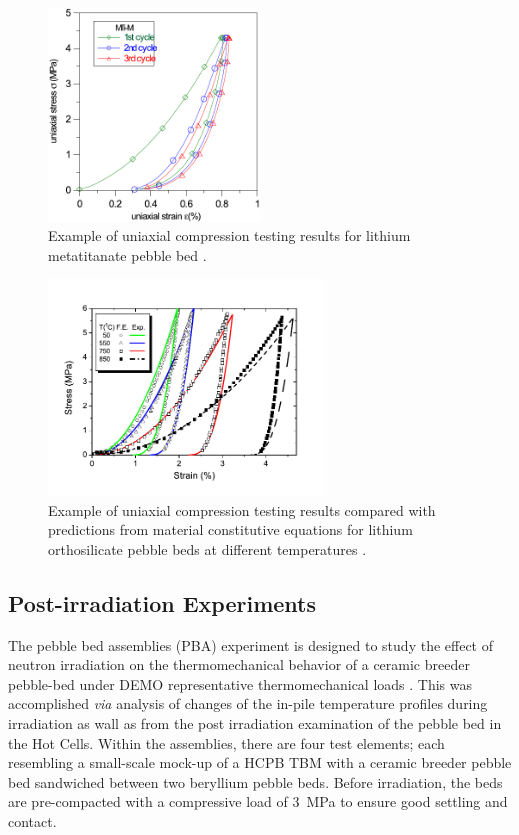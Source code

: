 \documentclass[11pt]{report} %
\begin{document}
\begin{figure}[h]
    \centering
    \includegraphics[width=0.5\textwidth]{images/Fig-1}
    \caption{Example of uniaxial compression testing results for lithium metatitanate pebble bed \cite{vanderlaan2011}.}
    \label{fig:mti}
\end{figure}

\begin{figure}[h]
    \centering
    \includegraphics[width=0.65\textwidth]{images/Fig-2}
    \caption{Example of uniaxial compression testing results compared with predictions from material constitutive equations for lithium orthosilicate pebble beds at different temperatures \cite{Gan:2008kx}.}
    \label{fig:UCT}
\end{figure}

\FloatBarrier
\subsection{Post-irradiation Experiments}
The pebble bed assemblies (PBA) experiment is designed to study the effect of neutron irradiation on the thermomechanical behavior of a ceramic breeder pebble-bed under DEMO representative thermomechanical loads \cite{Magielsen2007}. This was accomplished \textit{via} analysis of changes of the in-pile temperature profiles during irradiation as wall as from the post irradiation examination of the pebble bed in the Hot Cells. Within the assemblies, there are four test elements; each resembling a small-scale mock-up of a HCPB TBM with a ceramic breeder pebble bed sandwiched between two beryllium pebble beds. Before irradiation, the beds are pre-compacted with a compressive load of \SI{3}{\mega\pascal} to ensure good settling and contact.
\end{document}
